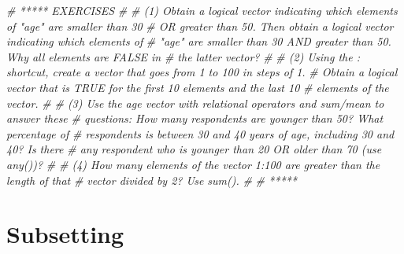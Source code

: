 \documentclass[
]{book}
\newenvironment{Shaded}{\begin{snugshade}}{\end{snugshade}}
\newcommand{\CommentTok}[1]{\textcolor[rgb]{0.56,0.35,0.01}{\textit{#1}}}
\begin{document}
\begin{Shaded}
\begin{Highlighting}[]
\CommentTok{\# ***** EXERCISES}
\CommentTok{\#}
\CommentTok{\# (1) Obtain a logical vector indicating which elements of "age" are smaller than 30}
\CommentTok{\# OR greater than 50. Then obtain a logical vector indicating which elements of}
\CommentTok{\# "age" are smaller than 30 AND greater than 50. Why all elements are FALSE in}
\CommentTok{\# the latter vector?}
\CommentTok{\#}
\CommentTok{\# (2) Using the : shortcut, create a vector that goes from 1 to 100 in steps of 1.}
\CommentTok{\# Obtain a logical vector that is TRUE for the first 10 elements and the last 10}
\CommentTok{\# elements of the vector.}
\CommentTok{\#}
\CommentTok{\# (3) Use the age vector with relational operators and sum/mean to answer these}
\CommentTok{\# questions: How many respondents are younger than 50? What percentage of}
\CommentTok{\# respondents is between 30 and 40 years of age, including 30 and 40? Is there}
\CommentTok{\# any respondent who is younger than 20 OR older than 70 (use any())?}
\CommentTok{\#}
\CommentTok{\# (4) How many elements of the vector 1:100 are greater than the length of that }
\CommentTok{\# vector divided by 2? Use sum().}
\CommentTok{\#}
\CommentTok{\# *****}
\end{Highlighting}
\end{Shaded}

\hypertarget{subsetting}{%
\section{Subsetting}\label{subsetting}}
\end{document}
